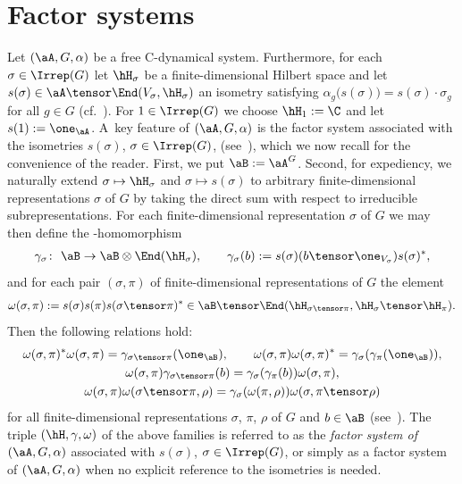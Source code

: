 \section{Factor systems}\label{sec:facsys}

Let $(\aA,G,\alpha)$ be a free C\Star-dynamical system.
Furthermore, for each $\sigma \in \Irrep(G)$ let $\hH_\sigma$ be a finite-dimensional Hilbert space and let $s(\sigma) \in \aA \tensor \End(V_\sigma,\hH_\sigma)$ an isometry satisfying $\alpha_g\bigl(s(\sigma)\bigr)=s(\sigma) \cdot \sigma_g$ for all $g \in G$ (cf.~\cite[Lemma~3.3]{SchWa17c}).
For $1 \in \Irrep(G)$ we choose $\hH_1 := \C$ and let $s(1) := \one_\aA$.
A~key feature of $(\aA,G,\alpha)$ is the factor system associated with the isometries $s(\sigma)$, $\sigma \in \Irrep(G)$, (see~\cite[Definition~4.1]{SchWa17c}), which we now recall for the convenience of the reader.
First, we put $\aB := \aA^G$.
Second, for expediency, we naturally extend $\sigma \mapsto \hH_\sigma$ and $\sigma \mapsto s(\sigma)$ to arbitrary finite-dimensional representations $\sigma$ of $G$ by taking the direct sum with respect to irreducible subrepresentations.
For each finite-dimensional representation $\sigma$ of $G$ we may then define the \Star-homomorphism
\begin{gather*}
	\gamma_\sigma\colon \ \aB \to \aB \otimes \End(\hH_\sigma),
	\qquad
	\gamma_\sigma(b) := s(\sigma) (b \tensor \one_{V_\sigma}) s(\sigma)^*,
\end{gather*}
and for each pair $(\sigma,\pi)$ of finite-dimensional representations of $G$ the element
\begin{gather*}
	\omega(\sigma,\pi) := s(\sigma) s(\pi) s(\sigma \tensor \pi)^* \in \aB \tensor \End(\hH_{\sigma \tensor \pi},\hH_\sigma \tensor \hH_\pi).
\end{gather*}
Then the following relations hold:
\begin{gather}
	\label{eq:ranges_sys}
	\omega(\sigma,\pi)^* \omega(\sigma,\pi) = \gamma_{\sigma \tensor \pi}(\one_\aB),
	\qquad
	\omega(\sigma,\pi) \omega(\sigma,\pi)^* = \gamma_\sigma (\gamma_\pi(\one_\aB) ),
	\\
	\label{eq:coaction_sys}
	\omega(\sigma, \pi) \gamma_{\sigma \tensor \pi}(b) = \gamma_\sigma( \gamma_\pi(b) ) \omega(\sigma, \pi),
	\\
	\label{eq:cocycle_sys}
	\omega(\sigma, \pi) \omega(\sigma \tensor \pi, \rho)
		= \gamma_\sigma ( \omega(\pi, \rho) ) \omega(\sigma, \pi \tensor \rho)
\end{gather}
for all finite-dimensional representations $\sigma$, $\pi$, $\rho$ of $G$ and $b \in \aB$ (see~\cite[Lemma~4.3]{SchWa20}).
The triple $(\hH, \gamma, \omega)$ of the above families is referred to as the \emph{factor system of $(\aA, G, \alpha)$} associated with $s(\sigma)$, $\sigma \in \Irrep(G)$, or simply as a factor system of $(\aA, G, \alpha)$ when no explicit reference to the isometries is needed.

